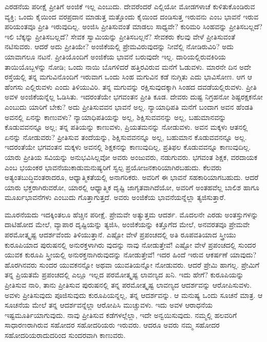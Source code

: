 ಎರಡನೆಯ ಪರೀಕ್ಷೆ ಪ್ರೀತಿಗೆ ಅಂಜಿಕೆ ಇಲ್ಲ ಎಂಬುದು. ದೇವರೆಂದರೆ ಎಲ್ಲಿಯೋ ಮೋಡಗಳಾಚೆ ಕುಳಿತುಕೊಂಡಿರುವ ವ್ಯಕ್ತಿ; ಒಂದು ಕೈಯಿಂದ ವರಪ್ರದಾನ ಮಾಡುತ್ತ ಮತ್ತೊಂದು ಕೈಯಿಂದ ದಂಡಿಸುತ್ತ ಇರುವನು ಎಂಬ ಭಾವನೆ ಇರುವ ಪರಿಯಂತವೂ ಪ್ರೀತಿ ಇರುವುದಿಲ್ಲ. ಅಂಜಿಸಿ ಪ್ರೀತಿಸುವಂತೆ ಮಾಡಲು ಸಾಧ್ಯವೇ? ಕುರಿಮರಿ ಸಿಂಹವನ್ನು ಪ್ರೀತಿಸಬಲ್ಲದೆ? ಇಲಿ ಬೆಕ್ಕನ್ನು ಪ್ರೀತಿಸಬಲ್ಲದೆ? ಸೇವಕ ಸ್ವಾಮಿಯನ್ನು ಪ್ರೀತಿಸಬಲ್ಲನೆ? ಸೇವಕರು ಕೆಲವು ವೇಳೆ ಪ್ರೀತಿಸುವಂತೆ ನಟಿಸುವರು. ಆದರೆ ಅದು ಪ್ರೀತಿಯೇ? ಅಂಜಿಕೆಯಲ್ಲಿ ಪ್ರೇಮವಿರುವುದನ್ನು ನೀವೆಲ್ಲಿ ನೋಡಿರುವಿರಿ? ಅದು ಯಾವಾಗಲೂ ನಟನೆ. ಪ್ರೀತಿಯೊಂದಿಗೆ ಅಂಜಿಕೆಯ ಭಾವನೆ ಬರುವುದೇ ಇಲ್ಲ. ದಾರಿಯಲ್ಲಿರುವಕಿರಿಯ ತಾಯಿಯೊಬ್ಬಳನ್ನು ನೋಡಿ; ಒಂದು ನಾಯಿ ಬೊಗಳಿದರೆ ಹತ್ತಿರವಿರುವ ಮನೆಗೆ ಓಡುವಳು. ಮಾರನೇ ದಿನ ಅದೇ ರಸ್ತೆಯಲ್ಲಿ ತನ್ನ ಮಗುವಿನೊಂದಿಗೆ ಇರುವಾಗ ಒಂದು ಸಿಂಹ ಮಗುವಿನ ಕಡೆ ನುಗ್ಗಿತು ಎದು ಭಾವಿಸೋಣ. ಆಗ ಆ ಹೆಂಗಸು ಎಲ್ಲಿರುವಳು ಎಂದು ತಿಳಿಯುವಿರಿ. ತನ್ನ ಮಗುವನ್ನು ರಕ್ಷಿಸುವುದಕ್ಕಾಗಿ ಸಿಂಹದ ದವಡೆಯಲ್ಲಿರುವಳು. ಪ್ರೀತಿ ಅವಳ ಅಂಜಿಕೆಯನ್ನೆಲ್ಲ ಓಡಿಸಿತು. ಇದರಂತೆಯೇ ಭಗವಂತನ ಪ್ರೀತಿ ಕೂಡ. ದೇವರು ದುಷ್ಟ ನಿಗ್ರಹನೋ ಶಿಷ್ಟರಕ್ಷಕನೋ ಎಂಬುದು ಯಾರಿಗೆ ಬೇಕು? ಅದು ಪ್ರೀತಿಸುವವನ ಭಾವನೆ ಅಲ್ಲ. ನ್ಯಾಯಾಧಿಪತಿ ಮನೆಗೆ ಬಂದಾಗ ಅವನ ಹೆಂಡತಿ ಅವನಲ್ಲಿ ಏನನ್ನು ಕಾಣುವಳು? ನ್ಯಾಯಾಧಿಪತಿಯನ್ನು ಅಲ್ಲ, ಶಿಕ್ಷಿಸುವವನನ್ನು ಅಲ್ಲ, ಬಹುಮಾನವನ್ನು ಕೊಡುವವನನ್ನೂ ಅಲ್ಲ; ತನ್ನ ಪತಿಯನ್ನು ಕಾಣುವಳು, ಪ್ರಿಯತಮನನ್ನು ನೋಡುವಳು. ಅವನ ಮಕ್ಕಳು ಆತನಲ್ಲಿ ಏನನ್ನು ನೋಡುವರು? ಪ್ರೀತಿಸುವ ತಂದೆಯನ್ನು, ಶಿಕ್ಷಿಸುವವನನ್ನೂ ಅಲ್ಲ, ಬಹುಮಾನ ಕೊಡುವವನನ್ನೂ ಅಲ್ಲ. ಇದರಂತೆಯೇ ಭಗವಂತನ ಮಕ್ಕಳು ಅವನಲ್ಲಿ ಶಿಕ್ಷಕನನ್ನು ಕಾಣುವುದಿಲ್ಲ, ಪ್ರತಿಫಲ ಕೊಡುವವನ್ನೂ ಕಾಣುವುದಿಲ್ಲ. ಯಾರು ಪ್ರೀತಿಯ ಸವಿಯನ್ನು ಅನುಭವಿಸಿಲ್ಲವೋ ಅವರು ಅಂಜುವರು, ನಡುಗುವರು. ಭಗವಂತ ಶಿಕ್ಷಕ, ವರದಾಯಕ ಎಂಬ ಭಯಂಕರ ಭಾವನೆಯುಕಾಡುಮನುಷ್ಯರಿಗೆ ಸ್ವಲ್ಪ ಪ್ರಯೋಜನಕಾರಿಯಾಗಿರಬಹುದು. ಕೆಲವರು ಅತ್ಯಂತಬುದ್ಧಿವಂತರಾದರೂ, ಆಧ್ಯಾತ್ಮಿಕತೆಯಲ್ಲಿ ಅನಾಗರಿಕರು. ಅವರಿಗೆ ಈ ಭಾವನೆ ಸಹಕಾರಿಯಾಗಬಹುದು. ಆದರೆ ಯಾರು ಭಕ್ತರಾಗಿರುವರೋ, ಯಾರಲ್ಲಿ ಆಧ್ಯಾತ್ಮಿಕ ದೃಷ್ಟಿ ಜಾಗೃತವಾಗಿದೆಯೋ, ಅವರಿಗೆ ಅಂತಹವೆಲ್ಲ ಬಾಲಿಶ ಹಾಗೂ ಮೂರ್ಖಭಾವನೆಗಳು ಎಂಬುದು ಗೊತ್ತಾಗುತ್ತದೆ. ಅವರು ಅಂಜಿಕೆಯ ಭಾವನೆಯನ್ನೆಲ್ಲಾ ತ್ಯಜಿಸುತ್ತಾರೆ.

ಮೂರನೆಯದು ಇದಕ್ಕಿಂತಲೂ ಹೆಚ್ಚಿನ ಪರೀಕ್ಷೆ. ಪ್ರೇಮವೇ ಅತ್ಯುತ್ತಮ ಆದರ್ಶ. ಮೊದಲನೇ ಎರಡು ಅಂತಸ್ತುಗಳನ್ನು ದಾಟಿಹೋದ ಮೇಲೆ, ವ್ಯಾಪಾರ ದೃಷ್ಟಿಯನ್ನು ತ್ಯಜಿಸಿ, ಅಂಜಿಕೆಯನ್ನು ಕಿತ್ತೊಗೆದ ಮೇಲೆ, ಅನವರತವೂ ಪ್ರೇಮವೇ ಪರಮೋತ್ಕೃಷ್ಟ ಆದರ್ಶವೆಂದು ತಿಳಿಯುತ್ತಾನೆ. ಎಷ್ಟೋ ವೇಳೆ ಪ್ರಪಂಚದಲ್ಲಿ ಅತಿ ರೂಪವತಿಯಾದ ಸ್ತ್ರೀಯು ಕುರೂಪಿಯಾದ ಪುರುಷನಲ್ಲಿ ಅನುರಕ್ತಳಾಗಿರು ವುದನ್ನು ನಾವು ನೋಡುತ್ತೇವೆ! ಎಷ್ಟೋ ವೇಳೆ ಪ್ರಪಂಚದಲ್ಲಿ ಸುಂದರ ಯುವಕ ಕುರೂಪಿ ಸ್ತ್ರೀಯಲ್ಲಿ ಅನುರಕ್ತನಾಗಿರುವುದನ್ನು ನೋಡುತ್ತೇವೆ! ಇದರ ಹಿಂದೆ ಇರುವ ಆಕರ್ಷಣೆ ಯಾವುದು? ಹೊರಗಿನವರು ಸುಂದರ ಯುವಕನನ್ನೋ ಅಥವಾ ಯುವತಿಯನ್ನೋ ನೋಡುವರು. ಆದರೆ ಪ್ರೇಮಿ ಹಾಗಲ್ಲ. ಪ್ರೇಮಿಗೆ ತನ್ನ ಪ್ರಿಯತಮೆ ಪ್ರಪಂಚದಲ್ಲಿ ಎಲ್ಲೂ ಇಲ್ಲದ ಪರಮೋತ್ಕೃಷ್ಟ ಲಾವಣ್ಯದ ಖನಿ. ಇದು ಹೇಗೆ? ಕುರೂಪಿಯನ್ನು ಪ್ರೀತಿಸುವ ನಾರಿ, ತಾನು ಪ್ರೀತಿಸುವ ಪುರುಷನಲ್ಲಿ ತನ್ನ ಪರಮೋತ್ಕೃಷ್ಟ ಲಾವಣ್ಯದ ಆದರ್ಶವನ್ನು ಆರೋಪಿಸುವಳು. ಅವಳು ಪ್ರೀತಿಸುವುದು ಪೂಜಿಸುವುದು ಕುರೂಪಿಯನ್ನಲ್ಲ, ತನ್ನ ಆದರ್ಶವನ್ನು. ಆ ಮನುಷ್ಯ ಒಂದು ಸೂಚನೆ ಮಾತ್ರ. ಆ ಸೂಚನೆಯ ಮೇಲೆ ತನ್ನ ಆದರ್ಶವನ್ನೆಲ್ಲಾ ಆರೋಪಿಸಿ ಮುಚ್ಚುವಳು. ಇದು ಅವಳ ಆರಾಧನೆಯ ಇಷ್ಟಮೂರ್ತಿಯಾಗುವುದು. ನಾವು ಪ್ರೀತಿಸುವ ಕಡೆಗಳಲ್ಲೆಲ್ಲಾ, ಇದೇ ಅನ್ವಯಿಸುವುದು. ನಮ್ಮಲ್ಲಿ ಹಲವರಿಗೆ ಸಾಧಾರಣರಾಗಿರುವ ಸಹೋದರ ಸಹೋದರಿಯರು ಇರುವರು. ಆದರೂ ಅವರು ನಮ್ಮ ಸಹೋದರ ಸಹೋದರಿಯರಾದುದರಿಂದ ಸುಂದರವಾಗಿ ಕಾಣುವರು.


